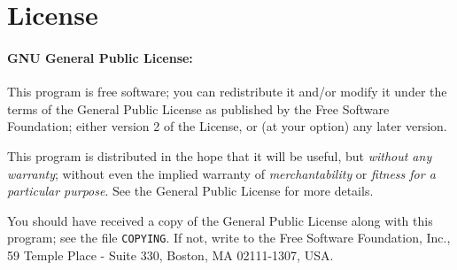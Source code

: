 %


\section{License}
\paragraph{GNU General Public License:} This program is free software;
you can redistribute it and/or modify
 it under the terms of the  General Public License as
 published by
 the Free Software Foundation; either version 2 of the License, or
 (at your option) any later version.

 This program is distributed in the hope that it will be useful,
 but \emph{without any warranty}; without even the implied warranty of
 \emph{merchant\-ability} or \emph{fitness for a particular purpose}.
 See the
  General Public License for more details.

 You should have received a copy of the  General
 Public License
 along with this program; see the file \texttt{COPYING}.  If not,
 write to
 the Free Software Foundation, Inc., 59 Temple Place - Suite 330,
 Boston, MA 02111-1307, USA.





